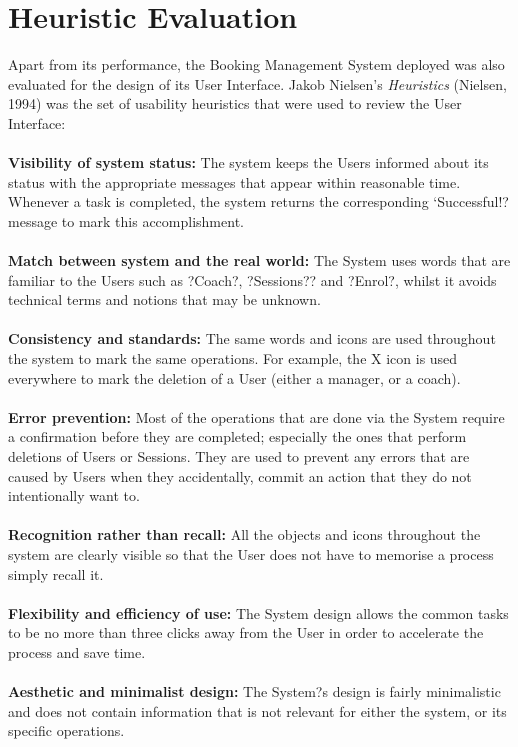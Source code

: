 \documentclass{l3proj}
\begin{document}
\section{Heuristic Evaluation}
Apart from its performance, the Booking Management System deployed was also evaluated for the design of its User Interface. Jakob Nielsen's \emph{Heuristics} (Nielsen, 1994) was the set of usability heuristics that were used to review the User Interface:\\
\\
\textbf{Visibility of system status:}
The system keeps the Users informed about its status with the appropriate messages that appear within reasonable time. Whenever a task is completed, the system returns the corresponding `Successful!? message to mark this accomplishment.\\
 \\
\textbf{Match between system and the real world:}
The System uses words that are familiar to the Users such as ?Coach?, ?Sessions?? and ?Enrol?, whilst it avoids technical terms and notions that may be unknown.\\
 \\
\textbf{Consistency and standards:}
The same words and icons are used throughout the system to mark the same operations. For example, the X icon is used everywhere to mark the deletion of a User (either a manager, or a coach).\\
 \\
\textbf{Error prevention:}
Most of the operations that are done via the System require a confirmation before they are completed; especially the ones that perform deletions of Users or Sessions. They are used to prevent any errors that are caused by Users when they accidentally, commit an action that they do not intentionally want to.\\
 \\
\textbf{Recognition rather than recall:}
All the objects and icons throughout the system are clearly visible so that the User does not have to memorise a process simply recall it.\\
 \\
\textbf{Flexibility and efficiency of use:}
The System design allows the common tasks to be no more than three clicks away from the User in order to accelerate the process and save time.\\
 \\
\textbf{Aesthetic and minimalist design:}
The System?s design is fairly minimalistic and does not contain information that is not relevant for either the system, or its specific operations.\\
\end{document}
